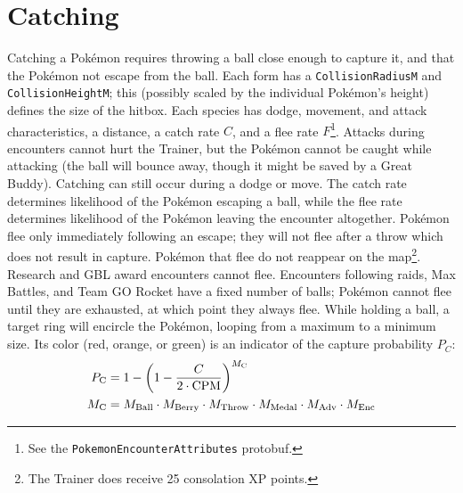 \section{Catching\label{sec:catch}}
Catching a Pokémon requires throwing a ball close enough to capture it,
 and that the Pokémon not escape from the ball.
Each form has a \texttt{CollisionRadiusM} and \texttt{CollisionHeightM}; this (possibly scaled by
 the individual Pokémon's height) defines the size of the hitbox.
Each species has dodge, movement, and attack characteristics, a distance, a catch rate $C$, and a flee rate
 $F$\footnote{See the \texttt{PokemonEncounterAttributes} protobuf.}.
Attacks during encounters cannot hurt the Trainer, but the Pokémon cannot be caught
  while attacking (the ball will bounce away, though it might be saved by a Great Buddy).
Catching can still occur during a dodge or move.
The catch rate determines likelihood of the Pokémon escaping a ball,
  while the flee rate determines likelihood of the Pokémon leaving the encounter altogether.
Pokémon flee only immediately following an escape; they will not flee after a throw which
  does not result in capture.
Pokémon that flee do not reappear on the map\footnote{The Trainer does receive 25 consolation XP points.}.
Research and GBL award encounters cannot flee.
Encounters following raids, Max Battles, and Team GO Rocket have a fixed number
 of balls; Pokémon cannot flee until they are exhausted, at which point they always flee.
While holding a ball, a target ring will encircle the Pokémon, looping from a maximum to a minimum size.
Its color (red, orange, or green) is an indicator of the capture probability $P_C$:
\begin{align*}
  P_\mathrm{C} &= 1-\left(1 - \frac{C}{2\cdot{}\mbox{CPM}}\right)^{M_\mathrm{C}}\\
  M_\mathrm{C} &= M_\mathrm{Ball} \cdot M_\mathrm{Berry} \cdot M_\mathrm{Throw} \cdot M_\mathrm{Medal} \cdot M_\mathrm{Adv} \cdot M_\mathrm{Enc}
\end{align*}
